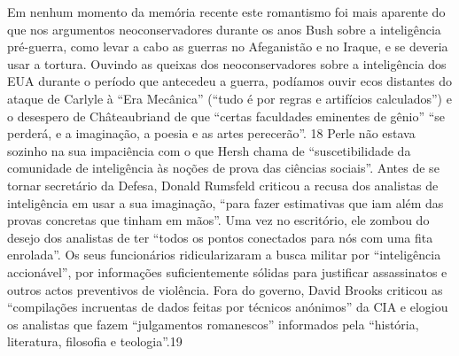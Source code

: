  \par 
Em nenhum momento da memória recente este romantismo foi mais aparente do que nos argumentos neoconservadores durante os anos Bush sobre a inteligência pré-guerra, como levar a cabo as guerras no Afeganistão e no Iraque, e se deveria usar a tortura. Ouvindo as queixas dos neoconservadores sobre a inteligência dos EUA durante o período que antecedeu a guerra, podíamos ouvir ecos distantes do ataque de Carlyle à “Era Mecânica” (“tudo é por regras e artifícios calculados”) e o desespero de Châteaubriand de que “certas faculdades eminentes de gênio” “se perderá, e a imaginação, a poesia e as artes perecerão”. {\color{blue}18} Perle não estava sozinho na sua impaciência com o que Hersh chama de “suscetibilidade da comunidade de inteligência às noções de prova das ciências sociais”. Antes de se tornar secretário da Defesa, Donald Rumsfeld criticou a recusa dos analistas de inteligência em usar a sua imaginação, “para fazer estimativas que iam além das provas concretas que tinham em mãos”. Uma vez no escritório, ele zombou do desejo dos analistas de ter “todos os pontos conectados para nós com uma fita enrolada”. Os seus funcionários ridicularizaram a busca militar por “inteligência accionável”, por informações suficientemente sólidas para justificar assassinatos e outros actos preventivos de violência. Fora do governo, David Brooks criticou as “compilações incruentas de dados feitas por técnicos anónimos” da CIA e elogiou os analistas que fazem “julgamentos romanescos” informados pela “história, literatura, filosofia e teologia”.{\color{blue}19}
 \par 
